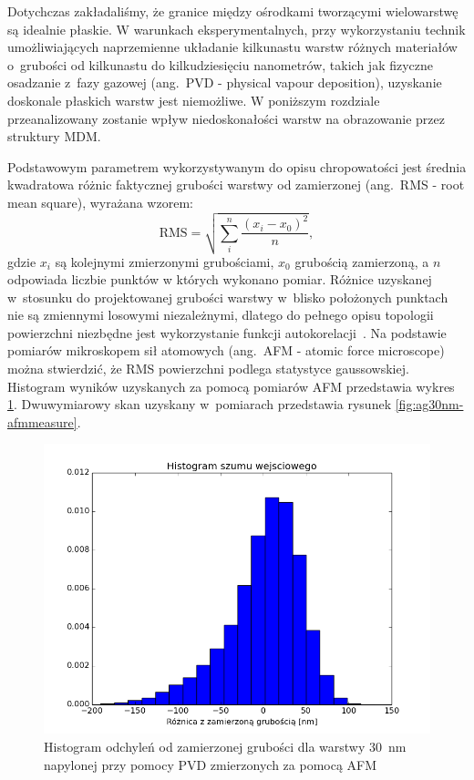 Dotychczas zakładaliśmy, że granice między ośrodkami tworzącymi wielowarstwę są idealnie płaskie. W warunkach eksperymentalnych, przy wykorzystaniu technik umożliwiających naprzemienne układanie kilkunastu warstw różnych materiałów o~grubości od kilkunastu do kilkudziesięciu nanometrów,  takich jak fizyczne osadzanie z~fazy gazowej (ang.~PVD - physical vapour deposition), uzyskanie doskonale płaskich warstw jest niemożliwe. W poniższym rozdziale przeanalizowany zostanie wpływ niedoskonałości warstw na obrazowanie przez struktury MDM.

Podstawowym parametrem wykorzystywanym do opisu chropowatości jest średnia kwadratowa różnic faktycznej grubości warstwy od zamierzonej (ang.~RMS - root mean square), wyrażana wzorem:
\begin{equation}
\textrm{RMS}=\sqrt{\sum_i^n \frac{(x_i -x_0)^2}{n}},
\end{equation}
gdzie $x_i$ są kolejnymi zmierzonymi grubościami, $x_0$ grubością zamierzoną, a $n$ odpowiada liczbie punktów w których wykonano pomiar. Różnice uzyskanej w~stosunku do projektowanej grubości warstwy w~blisko położonych punktach nie są zmiennymi losowymi niezależnymi, dlatego do pełnego opisu topologii powierzchni niezbędne jest wykorzystanie funkcji autokorelacji~\cite{stefaniuk2011effect}. Na podstawie pomiarów mikroskopem sił atomowych (ang.~AFM - atomic force microscope) można stwierdzić, że RMS powierzchni podlega statystyce gaussowskiej. Histogram wyników uzyskanych za pomocą pomiarów AFM przedstawia wykres \ref{fig:ag30nm-afmhist}. Dwuwymiarowy skan uzyskany w~pomiarach przedstawia rysunek \ref{fig:ag30nm-afmmeasure}.

\begin{figure}[bt]
		\includegraphics[width=\textwidth]{images/multilayer/ag30nm-afm-measure-hist.png}
		\caption{Histogram odchyleń od zamierzonej grubości dla warstwy $30$~nm napylonej przy pomocy PVD zmierzonych za pomocą AFM} 		\label{fig:ag30nm-afmhist}
\end{figure}

